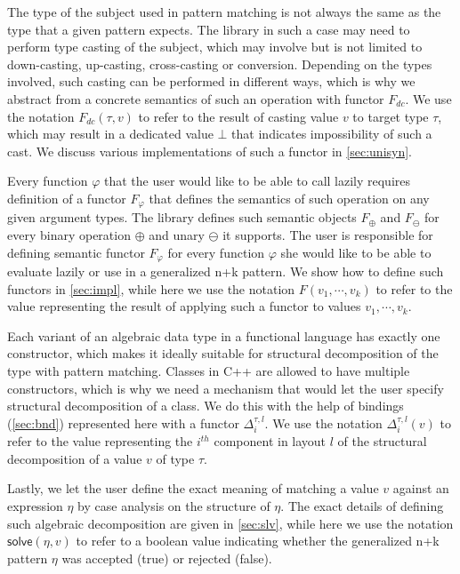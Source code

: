 \documentclass{llncs}
\newcommand{\nullptr}{\ensuremath{\bot}}
\begin{document}
\noindent
The type of the subject used in pattern matching is not always the same as the 
type that a given pattern expects. The library in such a case may need to 
perform type casting of the subject, which may involve but is not limited to 
down-casting, up-casting, cross-casting or conversion. Depending on the types 
involved, such casting can be performed in different ways, which is why we 
abstract from a concrete semantics of such an operation with functor $F_{dc}$. 
We use the notation $F_{dc}(\tau,v)$ to refer to the result of casting value $v$ 
to target type $\tau$, which may result in a dedicated value $\nullptr$ that 
indicates impossibility of such a cast. We discuss various implementations of 
such a functor in \textsection\ref{sec:unisyn}.

Every function $\varphi$ that the user would like to be able to call lazily 
requires definition of a functor $F_\varphi$ that defines the semantics of such 
operation on any given argument types. The library defines such semantic objects 
$F_\oplus$ and $F_\ominus$ for every binary operation $\oplus$ and unary 
$\ominus$ it supports. The user is responsible for defining semantic functor 
$F_\varphi$ for every function $\varphi$ she would like to be able to evaluate 
lazily or use in a generalized n+k pattern. We show how to define such functors 
in \textsection\ref{sec:impl}, while here we use the notation $F(v_1,\cdots,v_k)$ 
to refer to the value representing the result of applying such a functor to 
values $v_1,\cdots,v_k$.

Each variant of an algebraic data type in a functional language has exactly one 
constructor, which makes it ideally suitable for structural decomposition of the 
type with pattern matching. Classes in C++ are allowed to have multiple 
constructors, which is why we need a mechanism that would let the user specify 
structural decomposition of a class. We do this with the help of bindings 
(\textsection\ref{sec:bnd}) represented here with a functor $\Delta_i^{\tau,l}$. 
We use the notation $\Delta_i^{\tau,l}(v)$ to refer to the value representing 
the $i^{th}$ component in layout $l$ of the structural decomposition of a value 
$v$ of type $\tau$.

Lastly, we let the user define the exact meaning of matching a value $v$ against 
an expression $\eta$ by case analysis on the structure of $\eta$. The exact 
details of defining such algebraic decomposition are given in 
\textsection\ref{sec:slv}, while here we use the notation $\mathsf{solve}(\eta,v)$ 
to refer to a boolean value indicating whether the generalized n+k pattern 
$\eta$ was accepted (true) or rejected (false).
\end{document}
